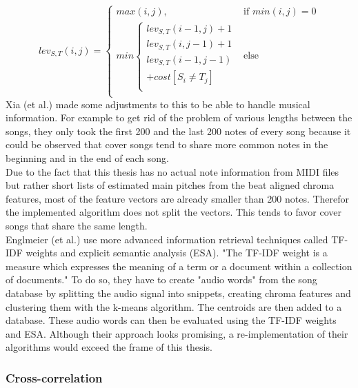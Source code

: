 \begin{equation} \label{eq:tr1}
lev_{S,T}(i, j) = \begin{cases}
max(i, j), &\text{if } min(i, j) = 0\\
min \begin{cases}
lev_{S,T}(i-1, j) + 1\\
lev_{S,T}(i, j-1) + 1\\
lev_{S,T}(i-1, j-1)\\
+cost[S_i \neq T_j]\\
\end{cases} &\text{else} \\
\end{cases}
\end{equation}
Xia (et al.) made some adjustments to this to be able to handle musical information.\cite[pp. 7ff]{chroma4} For example to get rid of the problem of various lengths between the songs, they only took the first 200 and the last 200 notes of every song because it could be observed that cover songs tend to share more common notes in the beginning and in the end of each song.\\
Due to the fact that this thesis has no actual note information from MIDI files but rather short lists of estimated main pitches from the beat aligned chroma features, most of the feature vectors are already smaller than 200 notes. Therefor the implemented algorithm does not split the vectors. This tends to favor cover songs that share the same length. 
\ \\
Englmeier  (et al.) use more advanced information retrieval techniques called TF-IDF weights and explicit semantic analysis (ESA). "The TF-IDF weight is a measure which expresses the meaning of a term or a document within a collection of documents." \cite[p. 186]{chroma1}
To do so, they have to create "audio words" from the song database by splitting the audio signal into snippets, creating chroma features and clustering them with the k-means algorithm. The centroids are then added to a database. These audio words can then be evaluated using the TF-IDF weights and ESA.
Although their approach looks promising, a re-implementation of their algorithms would exceed the frame of this thesis.

\subsubsection{Cross-correlation}


